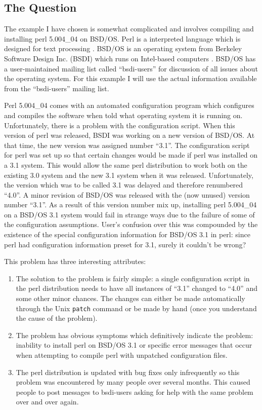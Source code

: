 \subsection{The Question}
The example I have chosen is somewhat complicated and involves compiling and
installing perl 5.004\_04 on BSD/OS. Perl is a interpreted language which is
designed for text processing \cite{programming-perl}. BSD/OS is an operating
system from Berkeley Software Design Inc. (BSDI) which runs on Intel-based
computers \cite{bsd-os}. BSD/OS has a user-maintained mailing list called
``bsdi-users'' for discussion of all issues about the operating system. For
this example I will use the actual information available from the
``bsdi-users'' mailing list.

Perl 5.004\_04 comes with an automated configuration program which configures
and compiles the software when told what operating system it is running on.
Unfortunately, there is a problem with the configuration script. When this
version of perl was released, BSDI was working on a new version of BSD/OS. At
that time, the new version was assigned number ``3.1''. The configuration
script for perl was set up so that certain changes would be made if perl was
installed on a 3.1 system. This would allow the same perl distribution to work
both on the existing 3.0 system and the new 3.1 system when it was released.
Unfortunately, the version which was to be called 3.1 was delayed and therefore
renumbered ``4.0''. A minor revision of BSD/OS was released with the (now
unused) version number ``3.1''. As a result of this version number mix up,
installing perl 5.004\_04 on a BSD/OS 3.1 system would fail in strange ways due
to the failure of some of the configuration assumptions. User's confusion over
this was compounded by the existence of the special configuration information
for BSD/OS 3.1 in perl: since perl had configuration information preset for
3.1, surely it couldn't be wrong?

This problem has three interesting attributes:
\begin{enumerate}
\item The solution to the problem is fairly simple: a single configuration
  script in the perl distribution needs to have all instances of ``3.1''
  changed to ``4.0'' and some other minor chances. The changes can either be
  made automatically through the Unix {\tt patch} command or be made by hand
  (once you understand the cause of the problem).
\item The problem has obvious symptoms which definitively indicate the problem:
  inability to install perl on BSD/OS 3.1 or specific error messages that occur
  when attempting to compile perl with unpatched configuration files.
\item The perl distribution is updated with bug fixes only infrequently so this
  problem was encountered by many people over several months. This caused
  people to post messages to bsdi-users asking for help with the same problem
  over and over again.
  \label{enum:repost}
\end{enumerate}

